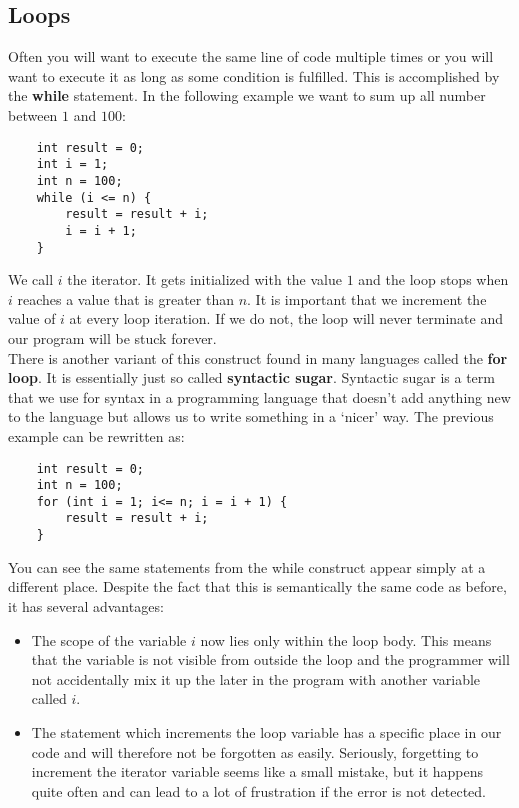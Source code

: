 \documentclass{scrreprt}
\begin{document}
\subsection{Loops}
Often you will want to execute the same line of code multiple times or you will want to execute it as long as some condition is fulfilled. This is accomplished by the \textbf{while} statement. In the following example we want to sum up all number between $1$ and $100$:
\begin{lstlisting}
	int result = 0;
	int i = 1;
	int n = 100;
	while (i <= n) {
		result = result + i;
		i = i + 1;
	}

\end{lstlisting}
We call $i$ the iterator. It gets initialized with the value $1$ and the loop stops when $i$ reaches a value that is greater than $n$. It is important that we increment the value of $i$ at every loop iteration. If we do not, the loop will never terminate and our program will be stuck forever. \\
There is another variant of this construct found in many languages called the \textbf{for loop}. It is essentially just so called \textbf{syntactic sugar}. Syntactic sugar is a term that we use for syntax in a programming language that doesn't add anything new to the language but allows us to write something in a `nicer' way. The previous example can be rewritten as:
\begin{lstlisting}
	int result = 0;
	int n = 100;
	for (int i = 1; i<= n; i = i + 1) {
		result = result + i;
	}
\end{lstlisting}
You can see the same statements from the while construct appear simply at a different place.
Despite the fact that this is semantically the same code as before, it has several advantages:
\begin{itemize}
\item The scope of the variable $i$ now lies only within the loop body. This means that the variable is not visible from outside the loop and the programmer will not accidentally mix it up the later in the program with another variable called $i$.
\item The statement which increments the loop variable has a specific place in our code and will therefore not be forgotten as easily. Seriously, forgetting to increment the iterator variable seems like a small mistake, but it happens quite often and can lead to a lot of frustration if the error is not detected.
\end{itemize}
\end{document}
